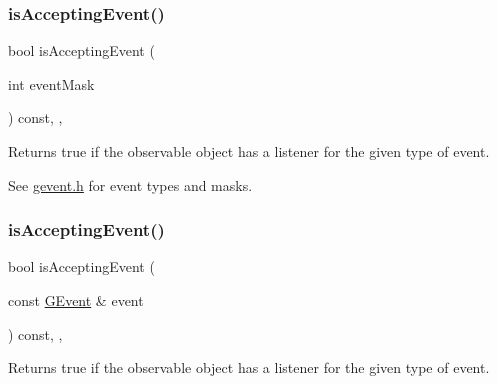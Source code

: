 \subsubsection{\texorpdfstring{is\+Accepting\+Event()}{isAcceptingEvent()}\hspace{0.1cm}{\footnotesize\ttfamily [1/3]}}
{\footnotesize\ttfamily bool is\+Accepting\+Event (\begin{DoxyParamCaption}\item[{int}]{event\+Mask }\end{DoxyParamCaption}) const\hspace{0.3cm}{\ttfamily [protected]}, {\ttfamily [virtual]}, {\ttfamily [inherited]}}



Returns true if the observable object has a listener for the given type of event. 

See \mbox{\hyperlink{gevent_8h_source}{gevent.\+h}} for event types and masks. \mbox{\label{classsgl_1_1GObservable_aa31c73145a29dcb92848a92e0cfaea41}} 
\subsubsection{\texorpdfstring{is\+Accepting\+Event()}{isAcceptingEvent()}\hspace{0.1cm}{\footnotesize\ttfamily [2/3]}}
{\footnotesize\ttfamily bool is\+Accepting\+Event (\begin{DoxyParamCaption}\item[{const \mbox{\hyperlink{classsgl_1_1GEvent}{G\+Event}} \&}]{event }\end{DoxyParamCaption}) const\hspace{0.3cm}{\ttfamily [protected]}, {\ttfamily [virtual]}, {\ttfamily [inherited]}}



Returns true if the observable object has a listener for the given type of event. 

\mbox{\label{classsgl_1_1GObservable_a3b1c689267eda44e65a2213e7de38b23}} 
